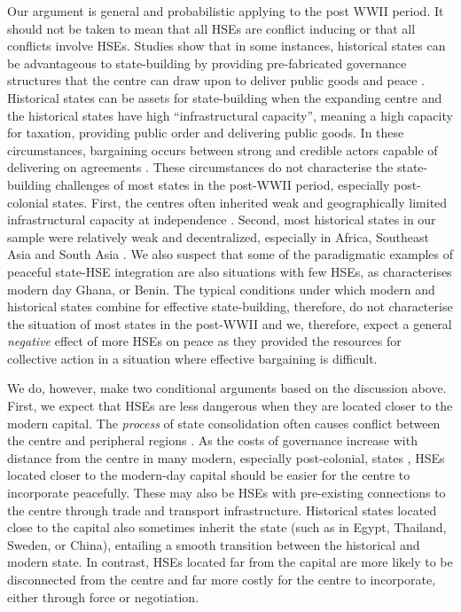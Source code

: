 Our argument is general and probabilistic applying to the post WWII period. It should not be taken to mean that all HSEs are conflict inducing or that all conflicts involve HSEs. Studies show that in some instances, historical states can be advantageous to state-building by providing pre-fabricated governance structures that the centre can draw upon to deliver public goods and peace \citep{Ziblatt2008}. Historical states can be assets for state-building when the expanding centre and the historical states have high ``infrastructural capacity'', meaning a high capacity for taxation, providing public order and delivering public goods. In these circumstances, bargaining occurs between strong and credible actors capable of delivering on agreements \citep{Ziblatt2008, Wig2016}. These circumstances do not characterise the state-building challenges of most states in the post-WWII period, especially post-colonial states. First, the centres often inherited weak and geographically limited infrastructural capacity at independence \citep{Herbst2014, Migdal1988}. Second, most historical states in our sample were relatively weak and decentralized, especially in Africa, Southeast Asia and South Asia \citep{Herbst2014, Scott2009}. We also suspect that some of the paradigmatic examples of peaceful state-HSE integration are also situations with few HSEs, as characterises modern day Ghana, or Benin. The typical conditions under which modern and historical states combine for effective state-building, therefore, do not characterise the situation of most states in the post-WWII and we, therefore, expect a general \textit{negative} effect of more HSEs on peace as they provided the resources for collective action in a situation where effective bargaining is difficult. 

We do, however, make two conditional arguments based on the discussion above. First, we expect that HSEs are less dangerous when they are located closer to the modern capital. The \textit{process} of state consolidation often causes conflict between the centre and peripheral regions \citep{Ying2020}. As the costs of governance increase with distance from the centre in many modern, especially post-colonial, states \citep{Herbst2014}, HSEs located closer to the modern-day capital should be easier for the centre to incorporate peacefully. These may also be HSEs with pre-existing connections to the centre through trade and transport infrastructure. Historical states located close to the capital also sometimes inherit the state (such as in Egypt, Thailand, Sweden, or China), entailing a smooth transition between the historical and modern state. In contrast, HSEs located far from the capital are more likely to be disconnected from the centre and far more costly for the centre to incorporate, either through force or negotiation. 

